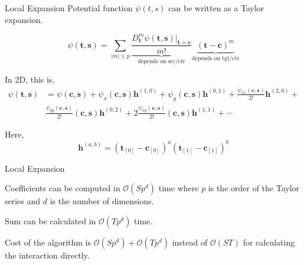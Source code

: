 \documentclass[10pt]{beamer}
\def\b#1{\mathbf{ #1}}
\begin{document}

\begin{frame}[fragile]{Local Expansion}
Potential function $\psi(t, s)$ can be written as a Taylor expansion.

\[
 \psi(\b t, \b s) = \sum_{|m| \le p} \underbrace{\frac{D_{\b t}^m \psi(\b t, \b s)\Bigr|_{\b t = \b c}}{m!}}_{\text{depends on src/ctr}} \underbrace{(\b t - \b c)^m}_{\text{depends on tgt/ctr}}
\]
\pause

In 2D, this is,
\begin{align*}
 \psi(\b t, \b s) &= \psi(\b c, \b s) + \psi_x(\b c, \b s)\b h^{(1, 0)} + \psi_y(\b c, \b s)\b h^{(0, 1)} +
\frac{\psi_{xx}(\b c, \b s)}{2!}\b h^{(2, 0)} + \\ & \frac{\psi_{yy}(\b c, \b s)}{2!}(\b c, \b s)\b h^{(0, 2)} + 2 \frac{\psi_{xy}(\b c, \b s)}{2!}(\b c, \b s)\b h^{(1, 1)} + \cdots
\end{align*}

Here,
\[
 \b h^{(a, b)} = (\b t_{[0]}-\b c_{[0]})^a (\b t_{[1]}-\b c_{[1]})^b 
\]

\end{frame}

\begin{frame}[fragile]{Local Expansion}

Coefficients can be computed in $\mathcal{O}(S p^d)$ time where $p$ is the order of the Taylor series and $d$ is the number of dimensions.

Sum can be calculated in $\mathcal{O}(T p^d)$ time.

Cost of the algorithm is $\mathcal{O}(S p^d) + \mathcal{O}(T p^d)$ instead of $\mathcal{O}(S T)$ for calculating the interaction directly.

\end{frame}
\end{document}
